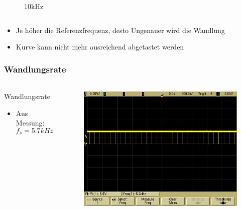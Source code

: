 \begin{frame}
\begin{columns}[c]
\begin{figure}[H]
\begin{center}
             \end{center}
             \caption{10kHz}
             \end{figure}
    \end{columns}
     \begin{block}{}
         \begin{itemize}
             \item Je höher die Referenzfrequenz, desto Ungenauer wird die
             Wandlung
             \item Kurve kann nicht mehr ausreichend abgetastet werden
         \end{itemize}
     \end{block}
\end{frame}
\begin{frame}
    \frametitle{Wandlungsrate}
    \framesubtitle{}
    \begin{columns}[c]
            \begin{block}{Wandlungsrate}
                \begin{itemize}
                    \item Aus Messung:  
                    \begin{equation*}
                        f_s = 5.7kHz
                    \end{equation*}
                \end{itemize}
            \end{block}
            \begin{figure}[H]
            \begin{center}
                    \includegraphics[scale=0.15]{./img/oszi/scope_13.png}
            \end{center}
            \end{figure}
    \end{columns}
\end{frame}
